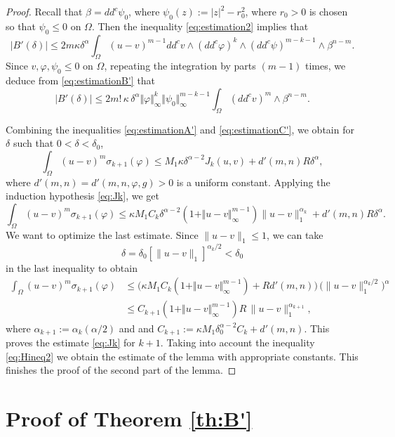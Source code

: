 \begin{proof}
Recall that $\beta = dd^c \psi_0$, where $\psi_0 (z) := \vert z\vert^2 -r_0^2$, where $r_0 > 0$ is chosen so that $\psi_0 \leq 0$ on $\Omega$.
Then the inequality \eqref{eq:estimation2} implies that
\begin{equation} \label{eq:estimationB'}
|B' (\delta)| \leq 2 m \kappa \delta^{\alpha} \int_\Omega (u-v)^{m -1} dd^c v \wedge (dd^c\varphi)^k \wedge (dd^c \psi)^{m - k-1} \wedge\beta^{n-m}.
\end{equation}
Since $v, \varphi, \psi_0 \leq 0$ on $\Omega$, repeating the integration by parts $(m-1)$ times, we deduce from \eqref{eq:estimationB'} that
\begin{equation} \label{eq:estimationC'}
|B' (\delta)| \leq 2 m! \, \kappa \, \delta^{\alpha} \Vert \varphi\Vert_{\infty}^k \Vert \psi_0\Vert_{\infty}^{m - k-1} \int_\Omega (dd^c v)^m \wedge\beta^{n-m}.
\end{equation}

Combining the inequalities \eqref{eq:estimationA'} and \eqref{eq:estimationC'}, we obtain for $\delta$ such that $0 < \delta < \delta_0$,
\[
\int_{\Omega}(u-v)^m \sigma_{k +1}(\varphi)\leq M_1 \kappa \delta^{\alpha- 2} J_k (u,v)+ d'(m,n) R \delta^{\alpha},
\]
where $d'(m,n) = d'(m,n,\varphi,g) > 0$ is a uniform constant.
Applying the induction hypothesis \eqref{eq:Jk}, we get
\[
\int_{\Omega}(u-v)^m \sigma_{k +1}(\varphi)\leq \kappa M_1 C_k\delta^{\alpha- 2}  (1+\Vert u - v \Vert_{\infty}^{m -1}) \|u-v\|_1^{\alpha_k}+ d'(m,n) R \delta^{\alpha}.
\]
We want to optimize the last estimate. Since $ \|u-v\|_1 \leq 1$, we can take
\[
\delta= \delta_0 [\|u-v\|_1]^{\alpha_k\slash 2} < \delta_0
\]
in the last inequality to obtain
\begin{align*}
\int_{\Omega}(u-v)^m \sigma_{k+1}(\varphi) &\leq  \bigl(\kappa M_1 C_k (1+\Vert u - v\Vert_{\infty}^{m -1}) + R d'(m,n)\bigr)\, \bigl(\|u-v\|_1^{\alpha_k \slash 2}\bigr)^{\alpha } \\
& \leq  C_{k + 1} (1 + \Vert u - v\Vert_{\infty}^{m -1} ) R\, \|u-v\|_1^{\alpha_{k+ 1}},
\end{align*}
where $\alpha_{k + 1} := \alpha_k (\alpha \slash 2)$ and and $C_{k+1} := \kappa M_1 \delta_0^{\alpha-2}C_k + d'(m,n)$.
This proves the estimate \eqref{eq:Jk} for $k+1$. Taking into account the inequality \eqref{eq:Hineq2} we obtain the estimate of the lemma with appropriate constants. This finishes the proof of the second part of the lemma.
\end{proof}

\section{Proof of Theorem \ref{th:B'}}

